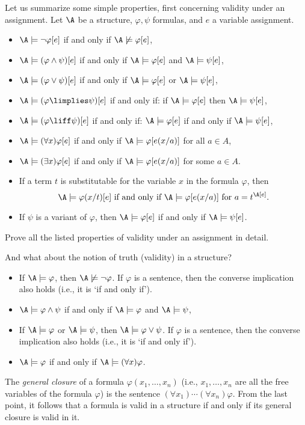 Let us summarize some simple properties, first concerning validity under an assignment. Let $\A$ be a structure, $\varphi,\psi$ formulas, and $e$ a variable assignment.
\begin{itemize}
    \item $\A\models\neg\varphi[e]$ if and only if $\A\not\models\varphi[e]$,
    \item $\A\models(\varphi\land\psi)[e]$ if and only if $\A\models\varphi[e]$ and $\A\models\psi[e]$,
    \item $\A\models(\varphi\lor\psi)[e]$ if and only if $\A\models\varphi[e]$ or $\A\models\psi[e]$,
    \item $\A\models(\varphi\limplies\psi)[e]$ if and only if: if $\A\models\varphi[e]$ then $\A\models\psi[e]$,
    \item $\A\models(\varphi\liff\psi)[e]$ if and only if: $\A\models\varphi[e]$ if and only if $\A\models\psi[e]$,
    \item $\A\models(\forall x)\varphi[e]$ if and only if $\A\models\varphi[e(x/a)]$ for all $a\in A$,
    \item $\A\models(\exists x)\varphi[e]$ if and only if $\A\models\varphi[e(x/a)]$ for some $a\in A$.
    \item If a term $t$ is substitutable for the variable $x$ in the formula $\varphi$, then
    $$
    \A\models\varphi(x/t)[e]\text{ if and only if }\A\models\varphi[e(x/a)]\text{ for }a=t^\A[e].
    $$
    \item If $\psi$ is a variant of $\varphi$, then $\A\models\varphi[e]$ if and only if $\A\models\psi[e]$.
\end{itemize}

\begin{exercise}
    Prove all the listed properties of validity under an assignment in detail.
\end{exercise}

And what about the notion of truth (validity) in a structure?
\begin{itemize}
    \item If $\A\models\varphi$, then $\A\not\models\neg\varphi$. If $\varphi$ is a sentence, then the converse implication also holds (i.e., it is `if and only if').
    \item $\A\models\varphi\land\psi$ if and only if $\A\models\varphi$ and $\A\models\psi$,
    \item If $\A\models\varphi$ or $\A\models\psi$, then $\A\models\varphi\lor\psi$. If $\varphi$ is a sentence, then the converse implication also holds (i.e., it is `if and only if').
    \item $\A\models\varphi$ if and only if $\A\models
    (\forall x)\varphi$.
\end{itemize}
The \emph{general closure} of a formula $\varphi(x_1,\dots,x_n)$ (i.e., $x_1,\dots,x_n$ are all the free variables of the formula $\varphi$) is the sentence $(\forall x_1)\cdots(\forall x_n)\varphi$. From the last point, it follows that a formula is valid in a structure if and only if its general closure is valid in it.

